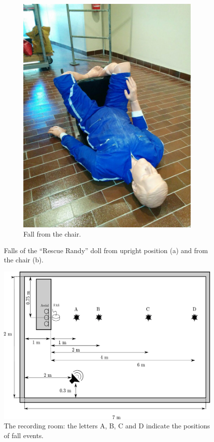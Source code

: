 \begin{figure}[t]
\begin{subfigure}[b]{0.40\textwidth}
		\includegraphics[width=\textwidth]{img/rndy_caduta_sedia.jpg}
		\caption{Fall from the chair.}\label{fig:randy_chair}
	\end{subfigure}
	\caption{Falls of the ``Rescue Randy'' doll from upright position (a) and from the chair (b).}\label{fig:randy}
\end{figure}

\begin{figure}[t]
	\centering
	\includegraphics[width=\columnwidth]{img/room_experiments.pdf}
	\caption{The recording room: the letters A, B, C and D indicate the positions of fall events.}
	\label{fig:room}
\end{figure}

